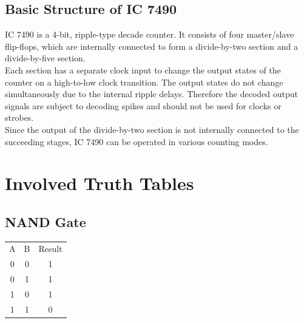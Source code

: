 \documentclass[11pt]{article}
\begin{document}
\subsection{Basic Structure of IC 7490}
IC 7490 is a 4-bit, ripple-type decade counter. It consists of four master/slave flip-flops, which are internally connected to form a divide-by-two section and a divide-by-five section.\\

Each section has a separate clock input to change the output states of the counter on a high-to-low clock transition. The output states do not change simultaneously due to the internal ripple delays. Therefore the decoded output signals are subject to decoding spikes and should not be used for clocks or strobes.\\

Since the output of the divide-by-two section is not internally connected to the succeeding stages, IC 7490 can be operated in various counting modes.\\

\section{Involved Truth Tables}

\subsection{NAND Gate}

\begin{table}[H]
	\begin{tabular}{|c|c|c|}
		\hline
		A & B & Result\\
		0 & 0 & 1 \\ \hline
		0 & 1 & 1 \\ \hline
		1 & 0 & 1 \\ \hline
		1 & 1 & 0 \\ \hline
		\end{tabular}
\end{table}
\end{document}
